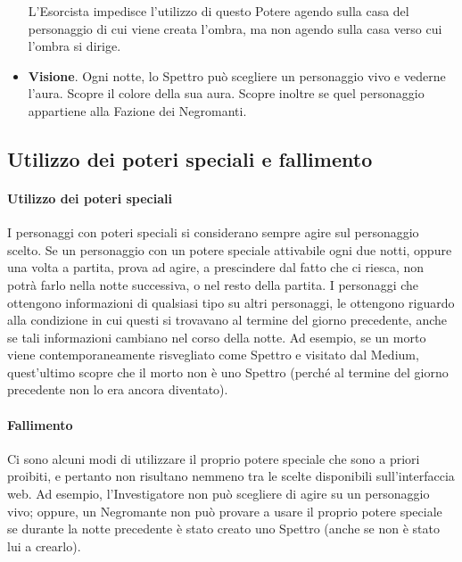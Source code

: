 \documentclass[a4paper,10pt]{article}
\begin{document}
\begin{itemize}
 L'Esorcista impedisce l'utilizzo di questo Potere agendo sulla casa del personaggio di cui viene creata l'ombra, ma non agendo sulla casa verso cui l'ombra si dirige.
 
 \item {\bf Visione}. Ogni notte, lo Spettro può scegliere un personaggio vivo e vederne l'aura. Scopre il colore della sua aura. Scopre inoltre se quel personaggio appartiene alla Fazione dei Negromanti.
 
%  

\end{itemize}


\subsection{Utilizzo dei poteri speciali e fallimento}
\label{fallimento}

\paragraph{Utilizzo dei poteri speciali} I personaggi con poteri speciali si considerano sempre agire sul personaggio scelto. %
Se un personaggio con un potere speciale attivabile ogni due notti, oppure una volta a partita, prova ad agire, a prescindere dal fatto che ci riesca, non potrà farlo nella notte successiva, o nel resto della partita.
I personaggi che ottengono informazioni di qualsiasi tipo su altri personaggi, le ottengono riguardo alla condizione in cui questi si trovavano al termine del giorno precedente, anche se tali informazioni cambiano nel corso della notte.
Ad esempio, se un morto viene contemporaneamente risvegliato come Spettro e visitato dal Medium, quest'ultimo scopre che il morto non è uno Spettro (perché al termine del giorno precedente non lo era ancora diventato).

\paragraph{Fallimento} Ci sono alcuni modi di utilizzare il proprio potere speciale che sono a priori proibiti, e pertanto non risultano nemmeno tra le scelte disponibili sull'interfaccia web. Ad esempio, l'Investigatore non può scegliere di agire su un personaggio vivo; oppure, un Negromante non può provare a usare il proprio potere speciale se durante la notte precedente è stato creato uno Spettro (anche se non è stato lui a crearlo).
\end{document}
